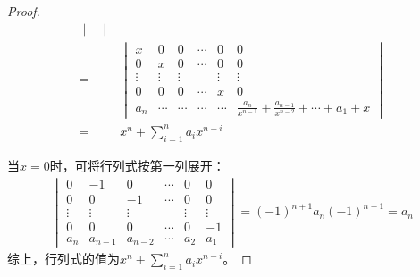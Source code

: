 \begin{proof}
\begin{align*}
\begin{vmatrix}
        \end{vmatrix}                                               \\
        = &
        \begin{vmatrix}
            x      & 0      & 0      & \cdots & 0      & 0                                                        \\
            0      & x      & 0      & \cdots & 0      & 0                                                        \\
            \vdots & \vdots & \vdots &        & \vdots & \vdots                                                   \\
            0      & 0      & 0      & \cdots & x      & 0                                                        \\
            a_n    & \cdots & \cdots & \cdots & \cdots & \frac{a_n}{x^{n-1}}+\frac{a_{n-1}}{x^{n-2}}+\cdots+a_1+x
        \end{vmatrix} \\
        = & x^n+\sum_{i=1}^{n}a_ix^{n-i}
    \end{align*}

    当\(x=0\)时，可将行列式按第一列展开：
    \begin{align*}
        \begin{vmatrix}
            0      & -1      & 0       & \cdots & 0      & 0      \\
            0      & 0       & -1      & \cdots & 0      & 0      \\
            \vdots & \vdots  & \vdots  &        & \vdots & \vdots \\
            0      & 0       & 0       & \cdots & 0      & -1     \\
            a_n    & a_{n-1} & a_{n-2} & \cdots & a_2    & a_1
        \end{vmatrix}=(-1)^{n+1}a_n(-1)^{n-1}=a_n
    \end{align*}
    综上，行列式的值为\(x^n+\sum_{i=1}^{n}a_ix^{n-i}\)。
\end{proof}


